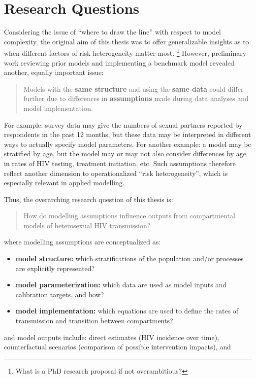 \section{Research Questions}\label{intro.rqs}
Considering the issue of ``where to draw the line'' with respect to model complexity,
the original aim of this thesis was to offer generalizable insights as to
when different factors of risk heterogeneity matter most.%
\footnote{What is a PhD research proposal if not overambitious?}
However, preliminary work reviewing prior models and implementing a benchmark model
revealed another, equally important issue:
\begin{quote}
  Models with the \textbf{same structure} and using the \textbf{same data}
  could differ further due to differences in
  \textbf{assumptions} made during data analyses and model implementation.
\end{quote}
For example:
survey data may give the numbers of sexual partners reported by respondents in the past 12 months,
but these data may be interpreted in different ways to actually specify model parameters.
For another example:
a model may be stratified by age, but the model may or may not also consider
differences by age in rates of HIV testing, treatment initiation, etc.
Such assumptions therefore reflect another dimension to operationalized ``risk heterogeneity'',
which is especially relevant in applied modelling.
\par
Thus, the overarching research question of this thesis is:
\begin{quote}
  How do modelling assumptions influence outputs from
  compartmental models of heterosexual HIV transmission?
\end{quote}
where modelling assumptions are conceptualized as:
\begin{itemize}
  \item \textbf{model structure:} which
  stratifications of the population and/or processes are explicitly represented?
  \item \textbf{model parameterization:} which
  data are used as model inputs and calibration targets, and how?
  \item \textbf{model implementation:} which
  equations are used to define the rates of transmission and transition between compartments?
\end{itemize}
and model outputs include:
direct estimates (\eg HIV incidence over time),
counterfactual scenarios (\eg comparison of possible intervention impacts), and

